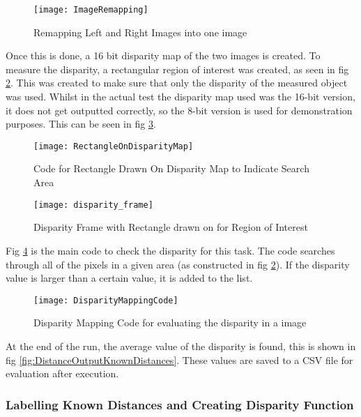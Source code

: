 \documentclass[conference]{IEEEtran}
\begin{document}
\begin{figure}[H]
\centerline{\texttt{[image: ImageRemapping]}}
\caption{Remapping Left and Right Images into one image}
\label{fig:ImageRemapping}
\end{figure}

Once this is done, a 16 bit disparity map of the two images is created. To measure the disparity, a rectangular region of interest was created, as seen in fig \ref{fig:RectangleOnDisparityMap}. This was created to make sure that only the disparity of the measured object was used. Whilst in the actual test the disparity map used was the 16-bit version, it does not get outputted correctly, so the 8-bit version is used for demonstration purposes. This can be seen in fig \ref{fig:disparity_frame}.

\begin{figure}[H]
\centerline{\texttt{[image: RectangleOnDisparityMap]}}
\caption{Code for Rectangle Drawn On Disparity Map to Indicate Search Area}
\label{fig:RectangleOnDisparityMap}
\end{figure}

\begin{figure}[H]
\centerline{\texttt{[image: disparity\_frame]}}
\caption{Disparity Frame with Rectangle drawn on for Region of Interest}
\label{fig:disparity_frame}
\end{figure}

Fig \ref{fig:DisparityMappingCode} is the main code to check the disparity for this task. The code searches through all of the pixels in a given area (as constructed in fig \ref{fig:RectangleOnDisparityMap}). If the disparity value is larger than a certain value, it is added to the list. 

\begin{figure}[H]
\centerline{\texttt{[image: DisparityMappingCode]}}
\caption{Disparity Mapping Code for evaluating the disparity in a image}
\label{fig:DisparityMappingCode}
\end{figure}

At the end of the run, the average value of the disparity is found, this is shown in fig \ref{fig:DistanceOutputKnownDistances}. These values are saved to a CSV file for evaluation after execution. 

\subsubsection{Labelling Known Distances and Creating Disparity Function}
\end{document}
